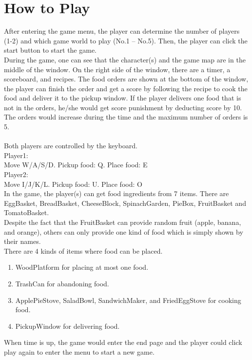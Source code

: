 \section{How to Play}
After entering the game menu, the player can determine the number of players (1-2) and which game world to play (No.1 – No.5). Then, the player can click the start button to start the game.\\
During the game, one can see that the character(s) and the game map are in the middle of the window. On the right side of the window, there are a timer, a scoreboard, and recipes. The food orders are shown at the bottom of the window, the player can finish the order and get a score by following the recipe to cook the food and deliver it to the pickup window. If the player delivers one food that is not in the orders, he/she would get score punishment by deducting score by 10. The orders would increase during the time and the maximum number of orders is 5.\\
\\
Both players are controlled by the keyboard.\\
Player1:\\
Move W/A/S/D. Pickup food: Q. Place food: E\\
Player2:\\
Move I/J/K/L. Pickup food: U. Place food: O\\
In the game, the player(s) can get food ingredients from 7 items. There are EggBasket, BreadBasket, CheeseBlock, SpinachGarden, PieBox, FruitBasket and TomatoBasket.\\
Despite the fact that the FruitBasket can provide random fruit (apple, banana, and orange), others can only provide one kind of food which is simply shown by their names.\\
There are 4 kinds of items where food can be placed.\\
\begin{enumerate}
	\item WoodPlatform for placing at most one food.
    \item TrashCan for abandoning food.
    \item ApplePieStove, SaladBowl, SandwichMaker, and FriedEggStove for cooking food.
    \item PickupWindow for delivering food.
\end{enumerate}
When time is up, the game would enter the end page and the player could click play again to enter the menu to start a new game.
